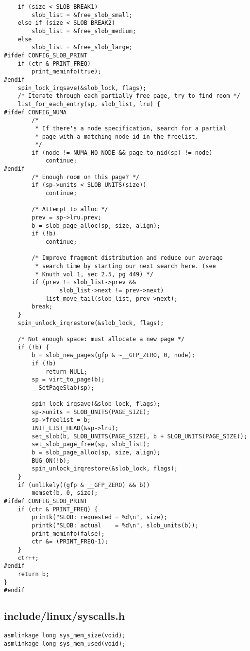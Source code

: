 \documentclass[letterpaper,10pt,titlepage,draftclsnofoot,onecolumn]{article}
\begin{document}
\begin{lstlisting}
	if (size < SLOB_BREAK1)
		slob_list = &free_slob_small;
	else if (size < SLOB_BREAK2)
		slob_list = &free_slob_medium;
	else
		slob_list = &free_slob_large;
#ifdef CONFIG_SLOB_PRINT
	if (ctr & PRINT_FREQ)
		print_meminfo(true);
#endif
	spin_lock_irqsave(&slob_lock, flags);
	/* Iterate through each partially free page, try to find room */
	list_for_each_entry(sp, slob_list, lru) {
#ifdef CONFIG_NUMA
		/*
		 * If there's a node specification, search for a partial
		 * page with a matching node id in the freelist.
		 */
		if (node != NUMA_NO_NODE && page_to_nid(sp) != node)
			continue;
#endif
		/* Enough room on this page? */
		if (sp->units < SLOB_UNITS(size))
			continue;

		/* Attempt to alloc */
		prev = sp->lru.prev;
		b = slob_page_alloc(sp, size, align);
		if (!b)
			continue;

		/* Improve fragment distribution and reduce our average
		 * search time by starting our next search here. (see
		 * Knuth vol 1, sec 2.5, pg 449) */
		if (prev != slob_list->prev &&
				slob_list->next != prev->next)
			list_move_tail(slob_list, prev->next);
		break;
	}
	spin_unlock_irqrestore(&slob_lock, flags);

	/* Not enough space: must allocate a new page */
	if (!b) {
		b = slob_new_pages(gfp & ~__GFP_ZERO, 0, node);
		if (!b)
			return NULL;
		sp = virt_to_page(b);
		__SetPageSlab(sp);

		spin_lock_irqsave(&slob_lock, flags);
		sp->units = SLOB_UNITS(PAGE_SIZE);
		sp->freelist = b;
		INIT_LIST_HEAD(&sp->lru);
		set_slob(b, SLOB_UNITS(PAGE_SIZE), b + SLOB_UNITS(PAGE_SIZE));
		set_slob_page_free(sp, slob_list);
		b = slob_page_alloc(sp, size, align);
		BUG_ON(!b);
		spin_unlock_irqrestore(&slob_lock, flags);
	}
	if (unlikely((gfp & __GFP_ZERO) && b))
		memset(b, 0, size);
#ifdef CONFIG_SLOB_PRINT
	if (ctr & PRINT_FREQ) {
		printk("SLOB: requested = %d\n", size);
		printk("SLOB: actual    = %d\n", slob_units(b));
		print_meminfo(false);
		ctr &= (PRINT_FREQ-1);
	}
	ctr++;
#endif
	return b;
}
#endif
\end{lstlisting}

\subsection*{include/linux/syscalls.h}
\begin{lstlisting}
asmlinkage long sys_mem_size(void);
asmlinkage long sys_mem_used(void);
\end{lstlisting}
\end{document}
